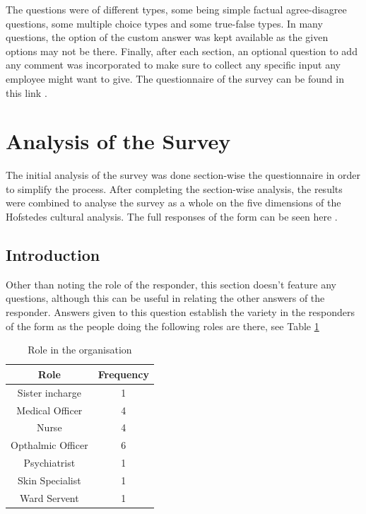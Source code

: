 \documentclass[12pt]{article}
\begin{document}
The questions were of different types, some being simple factual agree-disagree questions, some multiple choice types and some true-false types. In many questions, the option of the custom answer was kept available as the given options may not be there. Finally, after each section, an optional question to add any comment was incorporated to make sure to collect any specific input any employee might want to give. The questionnaire of the survey can be found in this link \cite{ref: Survey Form}.

\section{Analysis of the Survey}

The initial analysis of the survey was done section-wise the questionnaire in order to simplify the process. After completing the section-wise analysis, the results were combined to analyse the survey as a whole on the five dimensions of the Hofstedes cultural analysis. The full responses of the form can be seen here \cite{ref:Survey Results}.

\subsection{Introduction}

Other than noting the role of the responder, this section doesn't feature any questions, although this can be useful in relating the other answers of the responder. Answers given to this question establish the variety in the responders of the form as the people doing the following roles are there, see Table \ref{responder}

\begin{table}[H]
    \begin{center}
        \begin{tabular}{|c|c|}
            \hline
            Role & Frequency\\
            \hline
            Sister incharge & 1\\
            Medical Officer & 4\\
            Nurse & 4\\
            Opthalmic Officer & 6\\
            Psychiatrist & 1\\
            Skin Specialist & 1\\
            Ward Servent & 1\\
            \hline
        \end{tabular}
        \caption{Role in the organisation}
        \label{responder}
    \end{center}
\end{table}
\end{document}
